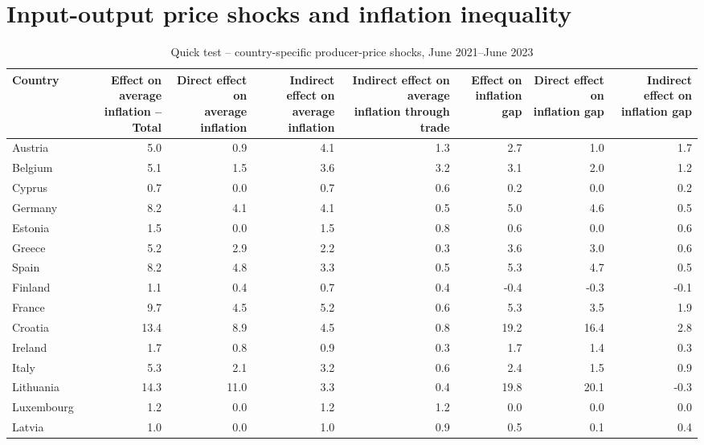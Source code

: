 \section*{Input-output price shocks and inflation inequality}
\begin{table}[H]
\centering
\caption{Quick test -- country-specific producer-price shocks, June 2021--June 2023}
\scriptsize
\setlength{\tabcolsep}{1.2pt}
\begin{tabular}{lrrrrrrr}
\toprule
Country & \shortstack{Effect on average\\inflation -- Total} & \shortstack{Direct effect on\\average inflation} & \shortstack{Indirect effect on\\average inflation} & \shortstack{Indirect effect on average\\inflation through trade} & \shortstack{Effect on\\inflation gap} & \shortstack{Direct effect on\\inflation gap} & \shortstack{Indirect effect on\\inflation gap}
 \\
\midrule
Austria & 5.0 & 0.9 & 4.1 & 1.3 & 2.7 & 1.0 & 1.7
 \\
Belgium & 5.1 & 1.5 & 3.6 & 3.2 & 3.1 & 2.0 & 1.2
 \\
Cyprus & 0.7 & 0.0 & 0.7 & 0.6 & 0.2 & 0.0 & 0.2
 \\
Germany & 8.2 & 4.1 & 4.1 & 0.5 & 5.0 & 4.6 & 0.5
 \\
Estonia & 1.5 & 0.0 & 1.5 & 0.8 & 0.6 & 0.0 & 0.6
 \\
Greece & 5.2 & 2.9 & 2.2 & 0.3 & 3.6 & 3.0 & 0.6
 \\
Spain & 8.2 & 4.8 & 3.3 & 0.5 & 5.3 & 4.7 & 0.5
 \\
Finland & 1.1 & 0.4 & 0.7 & 0.4 & -0.4 & -0.3 & -0.1
 \\
France & 9.7 & 4.5 & 5.2 & 0.6 & 5.3 & 3.5 & 1.9
 \\
Croatia & 13.4 & 8.9 & 4.5 & 0.8 & 19.2 & 16.4 & 2.8
 \\
Ireland & 1.7 & 0.8 & 0.9 & 0.3 & 1.7 & 1.4 & 0.3
 \\
Italy & 5.3 & 2.1 & 3.2 & 0.6 & 2.4 & 1.5 & 0.9
 \\
Lithuania & 14.3 & 11.0 & 3.3 & 0.4 & 19.8 & 20.1 & -0.3
 \\
Luxembourg & 1.2 & 0.0 & 1.2 & 1.2 & 0.0 & 0.0 & 0.0
 \\
Latvia & 1.0 & 0.0 & 1.0 & 0.9 & 0.5 & 0.1 & 0.4
 \\

\end{tabular}
\end{table}
